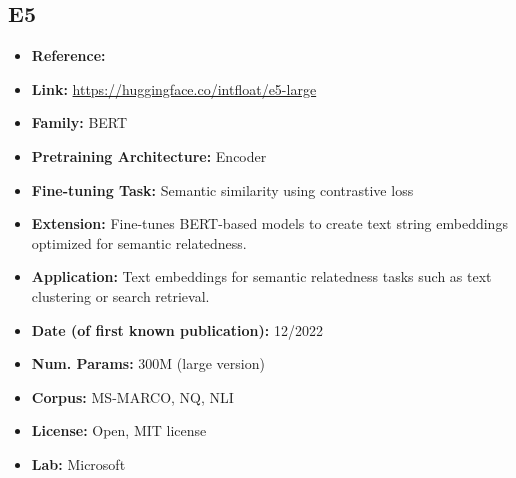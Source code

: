 \documentclass{article}
\begin{document}
\subsection{E5}
            \begin{itemize}
                \item \textbf{Reference:} 
                \item \textbf{Link:} \url{https://huggingface.co/intfloat/e5-large}
                \item \textbf{Family:} BERT 
                \item \textbf{Pretraining Architecture:} Encoder
                \item \textbf{Fine-tuning Task:} Semantic similarity using contrastive loss
                \item \textbf{Extension:} Fine-tunes BERT-based models to create text string embeddings optimized for semantic relatedness.  
                \item \textbf{Application:} Text embeddings for semantic relatedness tasks such as text clustering or search retrieval.
                \item \textbf{Date (of first known publication):} 12/2022
                \item \textbf{Num. Params:} 300M (large version)
                \item \textbf{Corpus:} MS-MARCO, NQ, NLI
                \item \textbf{License:} Open, MIT license
                \item \textbf{Lab:} Microsoft
            \end{itemize}
\end{document}
